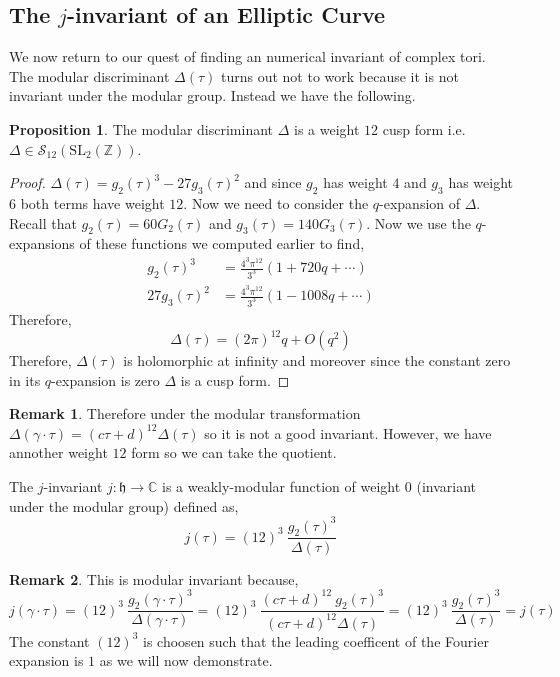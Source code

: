 \documentclass{article}
\newcommand{\SL}[0]{\mathrm{SL}}
\newcommand{\Z}{\mathbb{Z}}
\newcommand{\C}{\mathbb{C}}
\theoremstyle{definition}
\newtheorem{proposition}[theorem]{Proposition}
\newtheorem{remark}{Remark}[section]
\newenvironment{definition}[1][Definition:]{\begin{trivlist}
\item[\hskip \labelsep {\bfseries #1}]}{\end{trivlist}}
\renewcommand{\S}[1]{\mathcal{S}_{#1}}
\newcommand{\h}{\mathfrak{h}}
\newcommand{\MG}{\SL_2(\Z)}
\begin{document}
\subsection{The $j$-invariant of an Elliptic Curve}

We now return to our quest of finding an numerical invariant of complex tori. The modular discriminant $\Delta(\tau)$ turns out not to work because it is not invariant under the modular group. Instead we have the following.

\begin{proposition}
The modular discriminant $\Delta$ is a weight $12$ cusp form i.e. $\Delta \in \S{12}(\MG)$. 
\end{proposition}

\begin{proof}
$\Delta(\tau) = g_2(\tau)^3 - 27 g_3(\tau)^2$ and since $g_2$ has weight $4$ and $g_3$ has weight $6$ both terms have weight $12$. Now we need to consider the $q$-expansion of $\Delta$. Recall that $g_2(\tau) = 60 G_2(\tau)$ and $g_3(\tau) = 140 G_3(\tau)$. Now we use the $q$-expansions of these functions we computed earlier to find,
\begin{align*}
g_2(\tau)^3 & = \frac{4^3 \pi^{12}}{3^3} \left(1 + 720 q + \cdots \right)
\\
27 g_3(\tau)^2 & = \frac{4^3 \pi^{12}}{3^3} \left(1 - 1008 q  + \cdots \right)
\end{align*}
Therefore,
\[ \Delta(\tau) = (2 \pi)^{12} q + O(q^2) \]
Therefore, $\Delta(\tau)$ is holomorphic at infinity and moreover since the constant zero in its $q$-expansion is zero $\Delta$ is a cusp form. 
\end{proof}

\begin{remark}
Therefore under the modular transformation $\Delta(\gamma \cdot \tau) = (c \tau + d)^{12} \Delta(\tau)$ so it is not a good invariant. However, we have annother weight $12$ form so we can take the quotient.
\end{remark}

\begin{definition}
The $j$-invariant $j : \h \to \C$ is a weakly-modular function of weight $0$ (invariant under the modular group) defined as,
\[ j(\tau) = (12)^3 \: \frac{g_2(\tau)^3}{\Delta(\tau)} \] 
\end{definition}

\begin{remark}
This is modular invariant because,
\[ j(\gamma \cdot \tau) = (12)^3 \: \frac{g_2(\gamma \cdot \tau)^3}{\Delta(\gamma \cdot \tau)} = (12)^3 \: \frac{(c \tau + d)^{12} \: g_2(\tau)^3}{(c \tau + d)^{12} \Delta(\tau)} = (12)^3 \: \frac{g_2(\tau)^3}{\Delta(\tau)} = j(\tau) \]
The constant $(12)^3$ is choosen such that the leading coefficent of the Fourier expansion is $1$ as we will now demonstrate. 
\end{remark}
\end{document}
